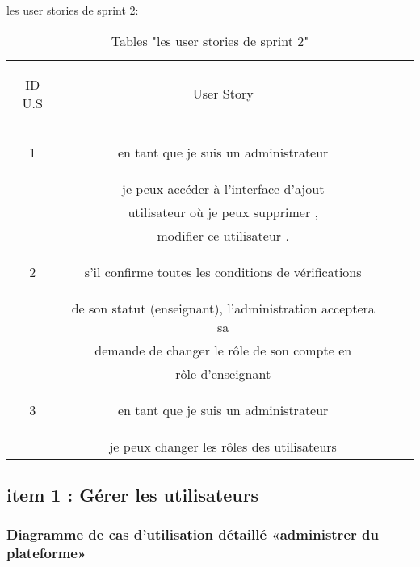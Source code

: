 \begin{table}[h]
	{\Large\color{cyan} les user stories de sprint 2:}\\
	
	\begin{center}
		\begin{tabular}{>{\begin{bf} } c <{\end{bf}}ccc}
			
			\rowcolor{-blue!20!red}ID U.S & \begin{bf}User Story \end{bf}  & \\
			
			1 &en tant que je suis un administrateur \\
			&je peux accéder à l'interface d'ajout \\
			&utilisateur  où je peux supprimer ,\\
			& modifier  ce utilisateur .    
			
			& \\	2 &s'il confirme toutes les conditions de vérifications \\ 
			&de son statut (enseignant), l'administration acceptera sa \\ 
			&demande de changer le rôle de son compte en\\ 
			& rôle d'enseignant
			\\
			3 & en tant que je suis un administrateur \\ 
			& je peux changer les rôles des  utilisateurs
			\\
			
			
			
			
		\end{tabular}
	\end{center}
	\caption{Tables  "les user stories de sprint 2"}
	\label{les user stories de sprint 2}
\end{table}




\clearpage

 
\subsection{item 1 : Gérer les utilisateurs}
\subsubsection{Diagramme de cas d’utilisation  détaillé «administrer du plateforme» }

